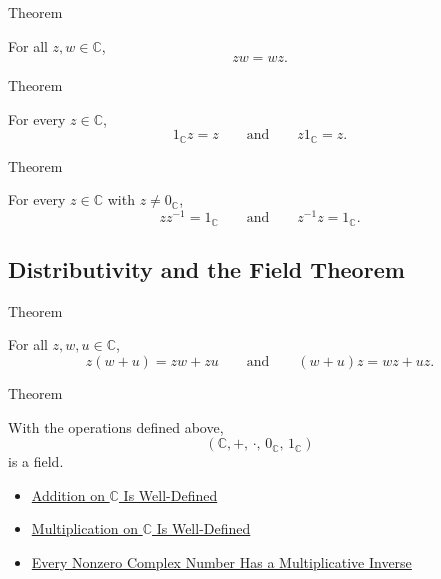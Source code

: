 \begin{theorembox}{Theorem}
\begin{theorem}
\label{thm:multiplication-on-c-commutative}
For all \(z,w\in\mathbb{C}\),
\[
zw=wz.
\]
\end{theorem}
\end{theorembox}

\begin{theorembox}{Theorem}
\begin{theorem}
\label{thm:one-multiplicative-identity-on-c}
For every \(z\in\mathbb{C}\),
\[
1_{\mathbb{C}}z=z
\qquad\text{and}\qquad
z1_{\mathbb{C}}=z.
\]
\end{theorem}
\end{theorembox}

\begin{theorembox}{Theorem}
\begin{theorem}
\label{thm:every-nonzero-complex-has-inverse}
For every \(z\in\mathbb{C}\) with \(z\ne 0_{\mathbb{C}}\),
\[
zz^{-1}=1_{\mathbb{C}}
\qquad\text{and}\qquad
z^{-1}z=1_{\mathbb{C}}.
\]
\end{theorem}
\end{theorembox}

\subsection*{Distributivity and the Field Theorem}

\begin{theorembox}{Theorem}
\begin{theorem}
\label{thm:multiplication-distributes-over-addition-on-c}
For all \(z,w,u\in\mathbb{C}\),
\[
z(w+u)=zw+zu
\qquad\text{and}\qquad
(w+u)z=wz+uz.
\]
\end{theorem}
\end{theorembox}

\begin{theorembox}{Theorem}
\begin{theorem}
\label{thm:c-is-a-field}
With the operations defined above,
\[
(\mathbb{C},+,\,\cdot,\,0_{\mathbb{C}},\,1_{\mathbb{C}})
\]
is a field.
\end{theorem}
\end{theorembox}

\begin{dependencies}
\begin{itemize}
  \item \hyperref[thm:addition-on-c-well-defined]{Addition on $\mathbb{C}$ Is Well-Defined}
  \item \hyperref[thm:multiplication-on-c-well-defined]{Multiplication on $\mathbb{C}$ Is Well-Defined}
  \item \hyperref[thm:every-nonzero-complex-has-inverse]{Every Nonzero Complex Number Has a Multiplicative Inverse}
\end{itemize}
\end{dependencies}

